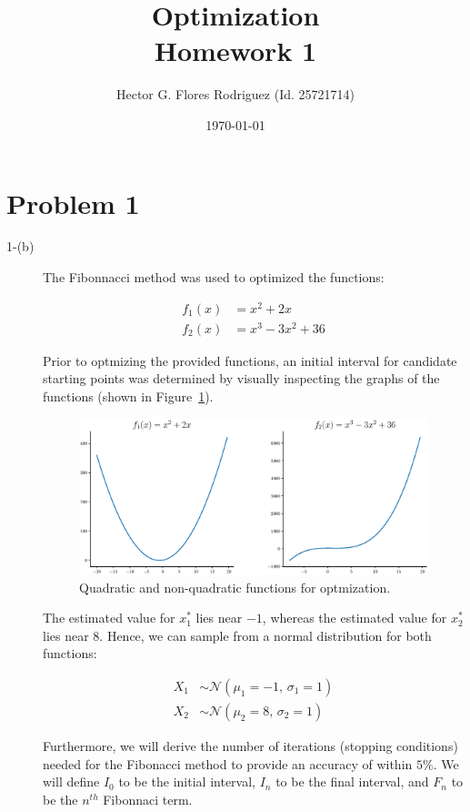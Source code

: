 \documentclass[11pt,onside]{article}
\title{\blue Optimization \\
\blueb Homework 1}
\author{Hector G. Flores Rodriguez (Id. 25721714)}
\date{\today} %
\begin{document}
\maketitle

\section{Problem 1}
\begin{description}
\item[1-(b)] The Fibonnacci method was used to optimized the functions:

\begin{align*}
f_{1}(x) &= x^2 + 2x \\
f_{2}(x) &= x^3 - 3x^2 + 36
\end{align*}

Prior to optmizing the provided functions, an initial interval for candidate starting points was determined by visually inspecting the graphs of the functions (shown in Figure~\ref{fig:functions}). 

\begin{figure}[h]
  \includegraphics[width=\linewidth]{figs/functions.eps}
  \caption{Quadratic and non-quadratic functions for optmization.}
  \label{fig:functions}
\end{figure}

The estimated value for $x_{1}^*$ lies near $-1$, whereas the estimated value for $x_{2}^*$ lies near $8$. Hence, we can sample from a normal distribution for both functions:

\begin{align*}
X_1 &\sim \mathcal{N}(\mu_{1} = -1,\,\sigma_{1} = 1) \\
X_2 &\sim \mathcal{N}(\mu_{2} = 8,\,\sigma_{2} = 1)
\end{align*}

Furthermore, we will derive the number of iterations (stopping conditions) needed for the Fibonacci method to provide an accuracy of within $5\%$. We will define $I_0$ to be the initial interval, $I_n$ to be the final interval, and $F_n$ to be the $n^{th}$ Fibonnaci term.


\end{description}
\end{document}

